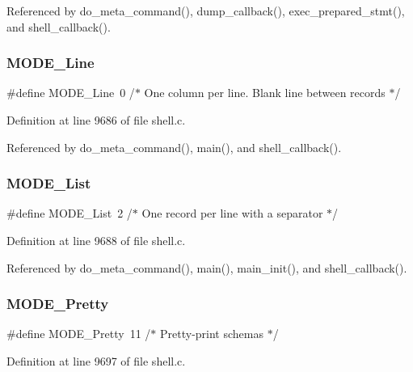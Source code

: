 Referenced by do\+\_\+meta\+\_\+command(), dump\+\_\+callback(), exec\+\_\+prepared\+\_\+stmt(), and shell\+\_\+callback().

\mbox{\label{shell_8c_a263016a113c6ae9360a9ec52e30144fe}} 
\subsubsection{M\+O\+D\+E\+\_\+\+Line}
{\footnotesize\ttfamily \#define M\+O\+D\+E\+\_\+\+Line~0  /$\ast$ One column per line.  Blank line between records $\ast$/}



Definition at line 9686 of file shell.\+c.



Referenced by do\+\_\+meta\+\_\+command(), main(), and shell\+\_\+callback().

\mbox{\label{shell_8c_a7ce872b14f83e2069adc18e0e2de9dfd}} 
\subsubsection{M\+O\+D\+E\+\_\+\+List}
{\footnotesize\ttfamily \#define M\+O\+D\+E\+\_\+\+List~2  /$\ast$ One record per line with a separator $\ast$/}



Definition at line 9688 of file shell.\+c.



Referenced by do\+\_\+meta\+\_\+command(), main(), main\+\_\+init(), and shell\+\_\+callback().

\mbox{\label{shell_8c_ace4dc32eaf0784d060406d34d447e232}} 
\subsubsection{M\+O\+D\+E\+\_\+\+Pretty}
{\footnotesize\ttfamily \#define M\+O\+D\+E\+\_\+\+Pretty~11  /$\ast$ Pretty-\/print schemas $\ast$/}



Definition at line 9697 of file shell.\+c.



